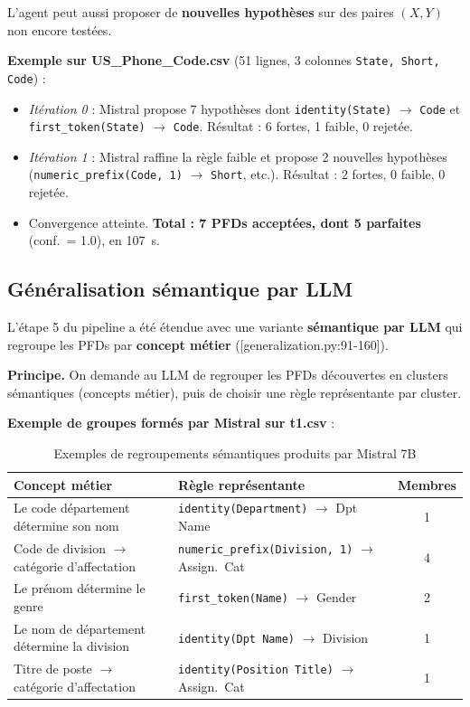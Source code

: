 \documentclass[12pt,a4paper]{article}
\begin{document}
L'agent peut aussi proposer de \textbf{nouvelles hypoth\`{e}ses} sur des paires $(X, Y)$ non encore test\'{e}es.

\textbf{Exemple sur US\_Phone\_Code.csv} (51 lignes, 3 colonnes \texttt{State, Short, Code}) :
\begin{itemize}
    \item \textit{It\'{e}ration 0} : Mistral propose 7 hypoth\`{e}ses dont
      \texttt{identity(State)} $\to$ \texttt{Code} et \texttt{first\_token(State)} $\to$ \texttt{Code}.
      R\'{e}sultat : 6 fortes, 1 faible, 0 rejet\'{e}e.
    \item \textit{It\'{e}ration 1} : Mistral raffine la r\`{e}gle faible et propose 2 nouvelles
      hypoth\`{e}ses (\texttt{numeric\_prefix(Code, 1)} $\to$ \texttt{Short}, etc.).
      R\'{e}sultat : 2 fortes, 0 faible, 0 rejet\'{e}e.
    \item Convergence atteinte. \textbf{Total : 7 PFDs accept\'{e}es, dont 5 parfaites} (conf.\ = 1.0), en 107~s.
\end{itemize}

\subsection{G\'{e}n\'{e}ralisation s\'{e}mantique par LLM}
\label{subsec:gen-llm}

L'\'{e}tape 5 du pipeline a \'{e}t\'{e} \'{e}tendue avec une variante \textbf{s\'{e}mantique par LLM} qui regroupe les PFDs par \textbf{concept m\'{e}tier} ([generalization.py:91-160]).

\textbf{Principe.} On demande au LLM de regrouper les PFDs d\'{e}couvertes en clusters s\'{e}mantiques (concepts m\'{e}tier), puis de choisir une r\`{e}gle repr\'{e}sentante par cluster.

\textbf{Exemple de groupes form\'{e}s par Mistral sur t1.csv} :

\begin{table}[H]
\centering
\caption{Exemples de regroupements s\'{e}mantiques produits par Mistral 7B}
\label{tab:llm-groups}
\footnotesize
\begin{tabularx}{\linewidth}{@{}XXc@{}}
\toprule
\textbf{Concept m\'{e}tier} & \textbf{R\`{e}gle repr\'{e}sentante} & \textbf{Membres} \\
\midrule
Le code d\'{e}partement d\'{e}termine son nom & \texttt{identity(Department)} $\to$ Dpt Name & 1 \\
Code de division $\to$ cat\'{e}gorie d'affectation & \texttt{numeric\_prefix(Division, 1)} $\to$ Assign.\ Cat & 4 \\
Le pr\'{e}nom d\'{e}termine le genre & \texttt{first\_token(Name)} $\to$ Gender & 2 \\
Le nom de d\'{e}partement d\'{e}termine la division & \texttt{identity(Dpt Name)} $\to$ Division & 1 \\
Titre de poste $\to$ cat\'{e}gorie d'affectation & \texttt{identity(Position Title)} $\to$ Assign.\ Cat & 1 \\
\bottomrule
\end{tabularx}
\end{table}
\end{document}
